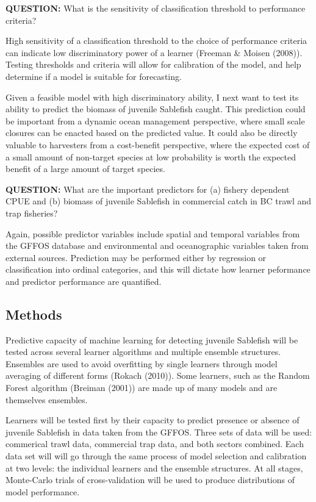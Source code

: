 \documentclass[12pt,]{scrartcl}
\begin{document}
\textbf{QUESTION:} What is the sensitivity of classification threshold
to performance criteria?

High sensitivity of a classification threshold to the choice of
performance criteria can indicate low discriminatory power of a learner
(Freeman \& Moisen (2008)). Testing thresholds and criteria will allow
for calibration of the model, and help determine if a model is suitable
for forecasting.

Given a feasible model with high discriminatory ability, I next want to
test its ability to predict the biomass of juvenile Sablefish caught.
This prediction could be important from a dynamic ocean management
perspective, where small scale closures can be enacted based on the
predicted value. It could also be directly valuable to harvesters from a
cost-benefit perspective, where the expected cost of a small amount of
non-target species at low probability is worth the expected benefit of a
large amount of target species.

\textbf{QUESTION:} What are the important predictors for (a) fishery
dependent CPUE and (b) biomass of juvenile Sablefish in commercial catch
in BC trawl and trap fisheries?

Again, possible predictor variables include spatial and temporal
variables from the GFFOS database and environmental and oceanographic
variables taken from external sources. Prediction may be performed
either by regression or classification into ordinal categories, and this
will dictate how learner peformance and predictor performance are
quantified.

\subsection{Methods}\label{methods-3}

Predictive capacity of machine learning for detecting juvenile Sablefish
will be tested across several learner algorithms and multiple ensemble
structures. Ensembles are used to avoid overfitting by single learners
through model averaging of different forms (Rokach (2010)). Some
learners, such as the Random Forest algorithm (Breiman (2001)) are made
up of many models and are themselves ensembles.

Learners will be tested first by their capacity to predict presence or
absence of juvenile Sablefish in data taken from the GFFOS. Three sets
of data will be used: commerical trawl data, commercial trap data, and
both sectors combined. Each data set will will go through the same
process of model selection and calibration at two levels: the individual
learners and the ensemble structures. At all stages, Monte-Carlo trials
of cross-validation will be used to produce distributions of model
performance.
\end{document}
